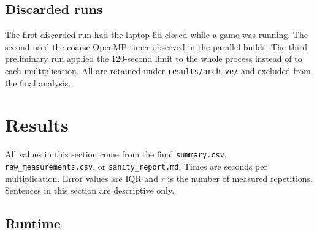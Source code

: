 \documentclass[a4paper,11pt]{article}
\begin{document}
\subsection{Discarded runs}

The first discarded run had the laptop lid closed while a game was running.
The second used the coarse OpenMP timer observed in the parallel builds. The
third preliminary run applied the 120-second limit to the whole process
instead of to each multiplication. All are retained under
\texttt{results/archive/} and excluded from the final analysis.

\section{Results}

All values in this section come from the final \texttt{summary.csv},
\texttt{raw\_measurements.csv}, or \texttt{sanity\_report.md}. Times are
seconds per multiplication. Error values are IQR and $r$ is the number of
measured repetitions. Sentences in this section are descriptive only.

\subsection{Runtime}
\end{document}
